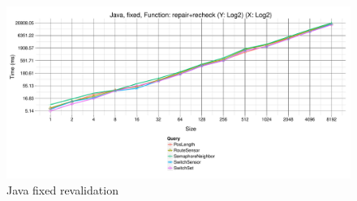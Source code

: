 \begin{figure}[h!tb]
  \centering
  \includegraphics[width=\textwidth]{figures/fixed-Java-GroupBy-Query-time-revalidation.pdf}
  \caption{Java fixed revalidation}
  \label{fig:JavaFixedReValidationBatch}
\end{figure}